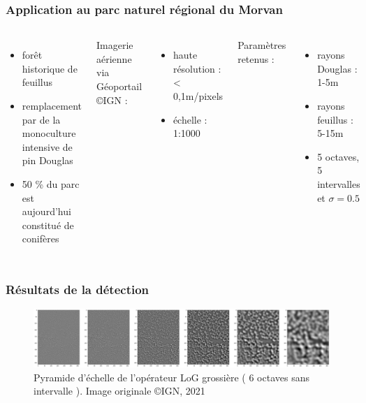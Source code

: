 \documentclass{beamer}
\begin{document}
\begin{frame}
	\frametitle{Application au parc naturel régional du Morvan}
	\begin{columns}
	\begin{itemize}
		\item forêt historique de feuillus
		\item remplacement par de la monoculture intensive de pin Douglas
		\item 50 \% du parc est aujourd'hui constitué de conifères
	\end{itemize}

	Imagerie aérienne via Géoportail \copyright IGN :
	\begin{itemize}
	\item haute résolution : < 0,1m/pixels
	\item échelle : 1:1000
	\end{itemize}

	Paramètres retenus :
	\begin{itemize}
		\item rayons Douglas : 1-5m
		\item rayons feuillus : 5-15m
		\item 5 octaves, 5 intervalles et $\sigma=0.5$
	\end{itemize}

	\centering
	\begin{figure}
		\includegraphics[scale=0.21,angle=90]{ilu.png}
	\end{figure}

\end{columns}
\end{frame}

\begin{frame}
	\frametitle{Résultats de la détection}
	\begin{figure}
	\includegraphics[scale=0.15]{index.png}
	\caption{Pyramide d'échelle de l'opérateur LoG grossière ( 6 octaves sans intervalle ). Image originale \copyright IGN, 2021  }
	\end{figure}
\end{frame}
\end{document}
